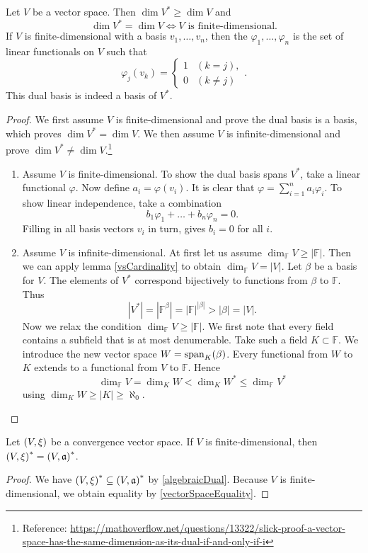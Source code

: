 \begin{proposition} \label{dualBasisDimension}
Let $V$ be a vector space. Then $\dim V^* \geq \dim V$ and
\[ \dim V^* = \dim V \iff \text{$V$ is finite-dimensional}. \]
If $V$ is finite-dimensional with a basis $v_1, \ldots, v_n$, then the  $\varphi_1, \ldots, \varphi_n$ is the set of linear functionals on $V$ such that
\[ \varphi_j(v_k) = \begin{cases}
1 & (k=j), \\ 0 & (k\neq j)
\end{cases}. \]
This dual basis is indeed a basis of $V^*$.
\end{proposition}
\begin{proof}
We first assume $V$ is finite-dimensional and prove the dual basis is a basis, which proves $\dim V^* = \dim V$. We then assume $V$ is infinite-dimensional and prove $\dim V^* \neq \dim V$.\footnote{Reference: \url{https://mathoverflow.net/questions/13322/slick-proof-a-vector-space-has-the-same-dimension-as-its-dual-if-and-only-if-i}}
\begin{enumerate}
\item Assume $V$ is finite-dimensional. To show the dual basis spans $V^*$, take a linear functional $\varphi$. Now define $a_i = \varphi(v_i)$. It is clear that $\varphi = \sum_{i=1}^n a_i\varphi_i$. To show linear independence, take a combination
\[ b_1\varphi_1 + \ldots +b_n\varphi_n =0. \]
Filling in all basis vectors $v_i$ in turn, gives $b_i=0$ for all $i$.
\item Assume $V$ is infinite-dimensional. At first let us assume $\dim_{\mathbb{F}}V \geq |\mathbb{F}|$. Then we can apply lemma \ref{vsCardinality} to obtain $\dim_{\mathbb{F}}V = |V|$. Let $\beta$ be a basis for $V$. The elements of $V^*$ correspond bijectively to functions from $\beta$ to $\mathbb{F}$. Thus
\[ |V^*| = |\mathbb{F}^\beta| = |\mathbb{F}|^{|\beta|} > |\beta| = |V|. \]
Now we relax the condition $\dim_{\mathbb{F}}V \geq |\mathbb{F}|$. We first note that every field contains a subfield that is at most denumerable. Take such a field $K\subset \mathbb{F}$. We introduce the new vector space $W = \operatorname{span}_K(\beta)$. Every functional from $W$ to $K$ extends to a functional from $V$ to $\mathbb{F}$. Hence
\[ \dim_\mathbb{F} V = \dim_K W < \dim_K W^* \leq \dim_{\mathbb{F}} V^* \]
using $\dim_{K}W \geq |K| \geq \aleph_0$.
\end{enumerate}
\end{proof}
\begin{corollary}
Let $\left( V,\xi \right)$ be a convergence vector space. If $V$ is finite-dimensional, then $\left( V,\xi \right)^* = \left( V,\mathfrak{a} \right)^*$.
\end{corollary}
\begin{proof}
We have $\left( V,\xi \right)^* \subseteq \left( V,\mathfrak{a} \right)^*$ by \ref{algebraicDual}. Because $V$ is finite-dimensional, we obtain equality by \ref{vectorSpaceEquality}.
\end{proof}

